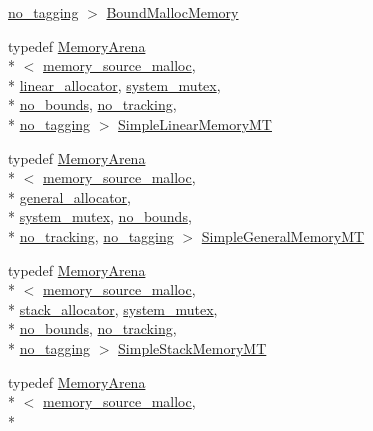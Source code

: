 \begin{DoxyCompactItemize}
\hyperlink{structcrap_1_1no__tagging}{no\+\_\+tagging} $>$ \hyperlink{namespacecrap_a8d06ec26605b8fbab3675d68bc669a2b}{Bound\+Malloc\+Memory}
\item 
typedef \hyperlink{classcrap_1_1_memory_arena}{Memory\+Arena}\\*
$<$ \hyperlink{classcrap_1_1memory__source__malloc}{memory\+\_\+source\+\_\+malloc}, \\*
\hyperlink{classcrap_1_1linear__allocator}{linear\+\_\+allocator}, \hyperlink{classcrap_1_1system__mutex}{system\+\_\+mutex}, \\*
\hyperlink{structcrap_1_1no__bounds}{no\+\_\+bounds}, \hyperlink{structcrap_1_1no__tracking}{no\+\_\+tracking}, \\*
\hyperlink{structcrap_1_1no__tagging}{no\+\_\+tagging} $>$ \hyperlink{namespacecrap_a98a843d877d8c0558c40574d0a0019e3}{Simple\+Linear\+Memory\+M\+T}
\item 
typedef \hyperlink{classcrap_1_1_memory_arena}{Memory\+Arena}\\*
$<$ \hyperlink{classcrap_1_1memory__source__malloc}{memory\+\_\+source\+\_\+malloc}, \\*
\hyperlink{classcrap_1_1general__allocator}{general\+\_\+allocator}, \\*
\hyperlink{classcrap_1_1system__mutex}{system\+\_\+mutex}, \hyperlink{structcrap_1_1no__bounds}{no\+\_\+bounds}, \\*
\hyperlink{structcrap_1_1no__tracking}{no\+\_\+tracking}, \hyperlink{structcrap_1_1no__tagging}{no\+\_\+tagging} $>$ \hyperlink{namespacecrap_a8c3afedb9f5acb5aa0e4e2767ccf0118}{Simple\+General\+Memory\+M\+T}
\item 
typedef \hyperlink{classcrap_1_1_memory_arena}{Memory\+Arena}\\*
$<$ \hyperlink{classcrap_1_1memory__source__malloc}{memory\+\_\+source\+\_\+malloc}, \\*
\hyperlink{classcrap_1_1stack__allocator}{stack\+\_\+allocator}, \hyperlink{classcrap_1_1system__mutex}{system\+\_\+mutex}, \\*
\hyperlink{structcrap_1_1no__bounds}{no\+\_\+bounds}, \hyperlink{structcrap_1_1no__tracking}{no\+\_\+tracking}, \\*
\hyperlink{structcrap_1_1no__tagging}{no\+\_\+tagging} $>$ \hyperlink{namespacecrap_aa7a4e4bf8df096c0ab06b0fdbf4c3c0f}{Simple\+Stack\+Memory\+M\+T}
\item 
typedef \hyperlink{classcrap_1_1_memory_arena}{Memory\+Arena}\\*
$<$ \hyperlink{classcrap_1_1memory__source__malloc}{memory\+\_\+source\+\_\+malloc}, \\*

\end{DoxyCompactItemize}

